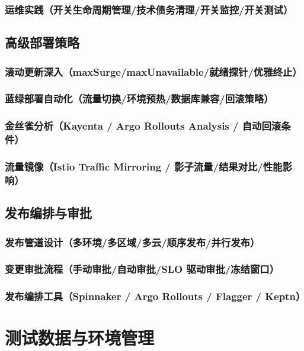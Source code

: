 \documentclass[12pt,UTF8]{ctexbook}
\begin{document}
    \subsection{运维实践（开关生命周期管理/技术债务清理/开关监控/开关测试）}

  \section{高级部署策略}
    \subsection{滚动更新深入（maxSurge/maxUnavailable/就绪探针/优雅终止）}
    \subsection{蓝绿部署自动化（流量切换/环境预热/数据库兼容/回滚策略）}
    \subsection{金丝雀分析（Kayenta / Argo Rollouts Analysis / 自动回滚条件）}
    \subsection{流量镜像（Istio Traffic Mirroring / 影子流量/结果对比/性能影响）}

  \section{发布编排与审批}
    \subsection{发布管道设计（多环境/多区域/多云/顺序发布/并行发布）}
    \subsection{变更审批流程（手动审批/自动审批/SLO 驱动审批/冻结窗口）}
    \subsection{发布编排工具（Spinnaker / Argo Rollouts / Flagger / Keptn）}


\chapter{测试数据与环境管理}
\label{chap:test-data-env}
\end{document}
